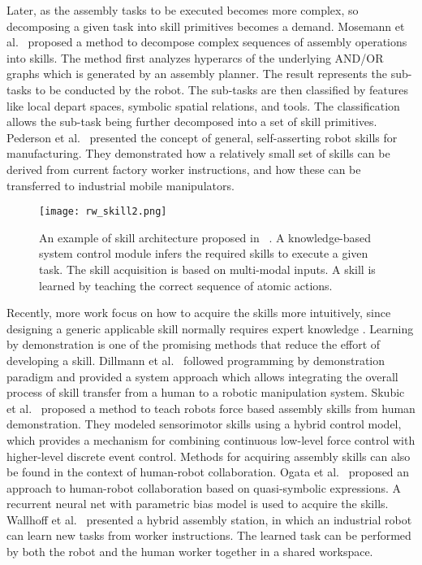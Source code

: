 Later, as the assembly tasks to be executed becomes more complex, so decomposing a given task into skill primitives becomes a demand.  Mosemann et al.~\cite{Mosemann2001} proposed a method to decompose complex sequences of assembly operations into skills. The method first analyzes hyperarcs of the underlying AND/OR graphs which is generated by an assembly planner. The result represents the sub-tasks to be conducted by the robot. The sub-tasks are then classified by features like local depart spaces, symbolic spatial relations, and tools. The classification allows the sub-task being further decomposed into a set of skill primitives. Pederson et al.~\cite{pedersen2016robot} presented the concept of general, self-asserting robot skills for manufacturing. They demonstrated how a relatively small set of skills can be derived from current factory worker instructions, and how these can be transferred to industrial mobile manipulators. 

\begin{figure}[!htbp]
\centering
\texttt{[image: rw\_skill2.png]}
\captionsetup{justification=raggedright}
\caption{An example of skill architecture proposed in ~\cite{Wallhoff2010}. A knowledge-based system control module infers the required skills to execute a given task. The skill acquisition is based on multi-modal inputs. A skill is learned by teaching the correct sequence of atomic actions. }
\label{fig:rw_skillarchitecture2}       %
\end{figure} 
Recently, more work focus on how to acquire the skills more intuitively, since designing a generic applicable skill normally requires expert knowledge \cite{Hovland1996}. Learning by demonstration is one of the promising methods that reduce the effort of developing a skill. Dillmann et al.~\cite{Dillmann2000} followed programming by demonstration paradigm and provided a system approach which allows integrating the overall process of skill transfer from a human to a robotic manipulation system.   Skubic et al.~\cite{Skubic2000} proposed a method to teach robots force based assembly skills from human demonstration. They modeled sensorimotor skills using a hybrid control model, which provides a mechanism for combining continuous low-level force control with higher-level discrete event control. Methods for acquiring assembly skills can also be found in the context of human-robot collaboration. Ogata et al.~\cite{Ogata2005} proposed an approach to human-robot collaboration based on quasi-symbolic expressions. A recurrent neural net with parametric bias  model is used to acquire the skills. Wallhoff et al.~\cite{Wallhoff2010} presented a hybrid assembly station, in which an industrial robot can learn new tasks from worker instructions. The learned task can be performed by both the robot and the human worker together in a shared workspace. 

